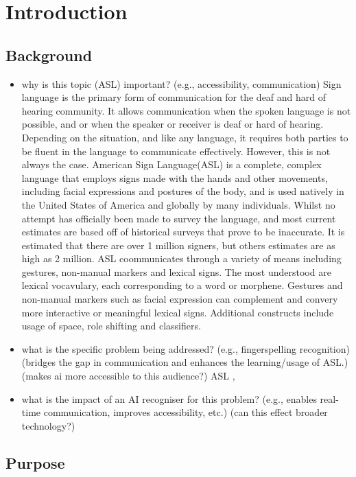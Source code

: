 \section{Introduction}
\subsection{Background}
\begin{itemize}
    \item why is this topic (ASL) important? (e.g., accessibility, communication)
    Sign language is the primary form of communication for the deaf and hard of hearing community. It allows communication when the spoken language is not possible, and or when the speaker or receiver is deaf or hard of hearing.
    Depending on the situation, and like any language, it requires both parties to be fluent in the language to communicate effectively. However, this is not always the case. American Sign Language(ASL) is a complete, complex language that employs signs made with the hands and other movements, including facial expressions and postures of the body, and is used natively in the
    United States of America and globally by many individuals. Whilst no attempt has officially been made to survey the language, and most current estimates are based off of historical surveys that prove to be inaccurate\cite{mitchellHowManyPeople2006}. It is estimated that there are over 1 million signers\cite{AmericanSignLanguage}, but others estimates are as high as 2 million\cite{mitchellHowManyPeople2006}.
    ASL coommunicates through a variety of means including gestures, non-manual markers and lexical signs. The most understood are lexical vocavulary, each corresponding to a word or morphene. Gestures and non-manual markers such as facial expression can complement and convery more interactive or meaningful lexical signs. Additional constructs include usage of space, role shifting and classifiers.
    \item what is the specific problem being addressed? (e.g., fingerspelling recognition) (bridges the gap in communication and enhances the learning/usage of ASL.) (makes ai more accessible to this audience?)
    ASL , 
    \item what is the impact of an AI recogniser for this problem? (e.g., enables real-time communication, improves accessibility, etc.) (can this effect broader technology?)
\end{itemize}

\subsection{Purpose}

